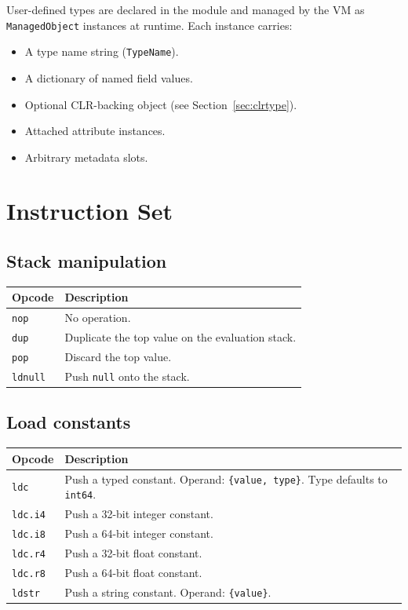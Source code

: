 \documentclass[11pt,a4paper]{article}
\begin{document}
User-defined types are declared in the module and managed by the VM as
\texttt{ManagedObject} instances at runtime.  Each instance carries:
\begin{itemize}
  \item A type name string (\texttt{TypeName}).
  \item A dictionary of named field values.
  \item Optional CLR-backing object (see Section~\ref{sec:clrtype}).
  \item Attached attribute instances.
  \item Arbitrary metadata slots.
\end{itemize}

\section{Instruction Set}

\subsection{Stack manipulation}

\begin{center}
\begin{tabular}{lp{10cm}}
\toprule
\textbf{Opcode} & \textbf{Description} \\
\midrule
\texttt{nop}    & No operation. \\
\texttt{dup}    & Duplicate the top value on the evaluation stack. \\
\texttt{pop}    & Discard the top value. \\
\texttt{ldnull} & Push \texttt{null} onto the stack. \\
\bottomrule
\end{tabular}
\end{center}

\subsection{Load constants}

\begin{center}
\begin{tabular}{lp{9cm}}
\toprule
\textbf{Opcode} & \textbf{Description} \\
\midrule
\texttt{ldc}      & Push a typed constant.  Operand: \texttt{\{value, type\}}.  Type defaults to \texttt{int64}. \\
\texttt{ldc.i4}   & Push a 32-bit integer constant. \\
\texttt{ldc.i8}   & Push a 64-bit integer constant. \\
\texttt{ldc.r4}   & Push a 32-bit float constant. \\
\texttt{ldc.r8}   & Push a 64-bit float constant. \\
\texttt{ldstr}    & Push a string constant.  Operand: \texttt{\{value\}}. \\
\bottomrule
\end{tabular}
\end{center}
\end{document}
